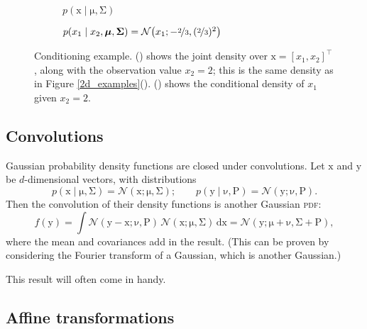 \documentclass{article}
\newcommand{\acro}[1]{\textsc{\MakeLowercase{#1}}}
\newcommand{\given}{\mid}
\newcommand{\mc}[1]{\mathcal{#1}}
\newcommand{\intd}[1]{\,\mathrm{d}{#1}}
\newcommand{\trans}{^\top}
\newcommand{\mat}[1]{\bm{\mathrm{#1}}}
\renewcommand{\vec}[1]{\bm{\mathrm{#1}}}
\begin{document}
\begin{figure}
  \centering
  \begin{subfigure}[t]{0.49\textwidth}
    
    \caption{$p(\vec{x} \given \vec{\mu}, \mat{\Sigma})$}
    \label{conditional_2d_pdf}
  \end{subfigure}
  \begin{subfigure}[t]{0.49\textwidth}
    
    \caption{$p(x_1 \given x_2, \vec{\mu}, \mat{\Sigma}) =
      \mc{N}\bigl(x_1; -\nicefrac{2}{3}, (\nicefrac{2}{3})^2\bigr)$}
    \label{conditional_pdf}
  \end{subfigure}
  \caption{Conditioning example.  () shows
    the joint density over $\vec{x} = [x_1, x_2]\trans$, along with
    the observation value $x_2 = 2$; this is the same density as in
    Figure \ref{2d_examples}().
    () shows the conditional density of
    $x_1$ given $x_2 = 2$.}
  \label{conditional_example}
\end{figure}

\subsection*{Convolutions}

Gaussian probability density functions are closed under convolutions.
Let $\vec{x}$ and $\vec{y}$ be $d$-dimensional vectors, with
distributions
\begin{equation*}
  p(\vec{x} \given \vec{\mu}, \mat{\Sigma})
  =
  \mc{N}(\vec{x}; \vec{\mu}, \mat{\Sigma});
  \qquad
  p(\vec{y} \given \vec{\nu}, \mat{P})
  =
  \mc{N}(\vec{y}; \vec{\nu}, \mat{P}).
\end{equation*}
Then the convolution of their density functions is another Gaussian
\acro{PDF}:
\begin{equation*}
  f(\vec{y}) =
  \int
  \mc{N}(\vec{y} - \vec{x}; \vec{\nu}, \mat{P})
  \,
  \mc{N}(\vec{x}; \vec{\mu}, \mat{\Sigma})
  \intd{\vec{x}}
  =
  \mc{N}(\vec{y}; \vec{\mu} + \vec{\nu}, \mat{\Sigma} + \mat{P}),
\end{equation*}
where the mean and covariances add in the result.  (This can be proven
by considering the Fourier transform of a Gaussian, which is another
Gaussian.)

This result will often come in handy.

\subsection*{Affine transformations}
\end{document}
